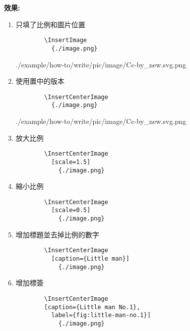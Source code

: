   {\bf 效果:}
  \begin{enumerate}
    \item
    {
      只填了比例和圖片位置
      \begin{verbatim}
        \InsertImage
          {./image.png}
      \end{verbatim}
      \InsertImage
        {./example/how-to/write/pic/image/Cc-by_new.svg.png}
    } %

    \item
    {
      使用置中的版本
      \begin{verbatim}
        \InsertCenterImage
          {./image.png}
      \end{verbatim}
      \InsertCenterImage
        {./example/how-to/write/pic/image/Cc-by_new.svg.png}
    } %

    \item
    {
      放大比例
      \begin{verbatim}
        \InsertCenterImage
          [scale=1.5]
            {./image.png}
      \end{verbatim}
    } %

    \newpage

    \item
    {
      縮小比例
      \begin{verbatim}
        \InsertCenterImage
          [scale=0.5]
            {./image.png}
      \end{verbatim}
    } %

    \item
    {
      增加標題並去掉比例的數字
      \begin{verbatim}
        \InsertCenterImage
          [caption={Little man}]
            {./image.png}
      \end{verbatim}
    } %

    \newpage
    \item
    {
      增加標簽
      \begin{verbatim}
        \InsertCenterImage
        [caption={Little man No.1},
          label={fig:little-man-no.1}]
            {./image.png}
      \end{verbatim}

}
\end{enumerate}
